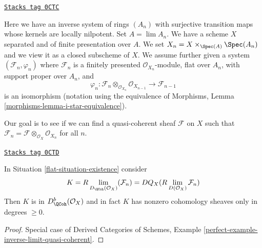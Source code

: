 \begin{definition}
\label{flat-situation-existence}
\href{https://stacks.math.columbia.edu/tag/0CTC}{\texttt{Stacks tag 0CTC}}

Here we have an inverse system of rings $(A_n)$ with surjective transition
maps whose kernels are locally nilpotent. Set $A = \lim A_n$. We have a
scheme $X$ separated and of finite presentation over $A$.
We set $X_n = X \times_{\Spec(A)} \Spec(A_n)$ and we
view it as a closed subscheme of $X$. We assume further given a system
$(\mathcal{F}_n, \varphi_n)$ where $\mathcal{F}_n$ is a finitely presented
$\mathcal{O}_{X_n}$-module, flat over $A_n$, with support proper over $A_n$,
and
$$
\varphi_n :
\mathcal{F}_n \otimes_{\mathcal{O}_{X_n}} \mathcal{O}_{X_{n - 1}}
\longrightarrow
\mathcal{F}_{n - 1}
$$
is an isomorphism (notation using the equivalence of
Morphisms, Lemma \ref{morphisms-lemma-i-star-equivalence}).
\end{definition}

Our goal is to see if we can find a quasi-coherent sheaf $\mathcal{F}$
on $X$ such that
$\mathcal{F}_n = \mathcal{F} \otimes_{\mathcal{O}_X} \mathcal{O}_{X_n}$
for all $n$.

\begin{lemma}
\label{flat-lemma-compute-what-it-should-be}
\href{https://stacks.math.columbia.edu/tag/0CTD}{\texttt{Stacks tag 0CTD}}

In Situation \ref{flat-situation-existence} consider
$$
K = R\lim_{D_\QCoh(\mathcal{O}_X)}(\mathcal{F}_n) =
DQ_X(R\lim_{D(\mathcal{O}_X)}\mathcal{F}_n)
$$
Then $K$ is in $D^b_{\QCoh}(\mathcal{O}_X)$ and in fact
$K$ has nonzero cohomology sheaves only in degrees $\geq 0$.
\end{lemma}

\begin{proof}
Special case of
Derived Categories of Schemes, Example
\ref{perfect-example-inverse-limit-quasi-coherent}.
\end{proof}

